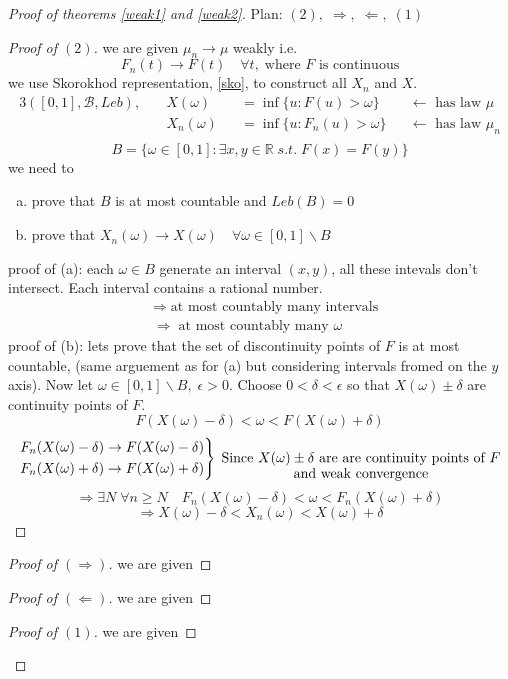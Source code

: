 \documentclass[12pt]{article}
\def\RR{\mathbb{R}}
\begin{document}
\begin{proof}[Proof of theorems \ref{weak1} and \ref{weak2}]
Plan: $(2), \; \Rightarrow, \; \Leftarrow,\; (1)$
\begin{proof}[Proof of $(2)$]
we are given $\mu_n \rightarrow \mu$ weakly i.e.
\[F_n(t) \rightarrow F(t) \quad \forall t, \; \text{where $F$ is continuous}\]
we use Skorokhod representation, \ref{sko}, to construct all $X_n$ and $X$.
 \begin{alignat*}{3}
([0,1],\mathcal{B}, Leb), \quad &X(\omega)& &= \inf\{u:F(u)>\omega\}& &\leftarrow \text{ has law }\mu \\
&X_n(\omega)& &=\inf\{u:F_n(u)>\omega\} &  &\leftarrow \text{ has law }\mu_n \\
\end{alignat*}
\[B= \{\omega \in [0,1] : \exists x,y \in \RR\; s.t. \; F(x)=F(y)\}\]
we need to
\begin{enumerate}[(a)]
\item prove that $B$ is at most countable and $Leb(B) = 0$
\item prove that $X_n(\omega) \rightarrow X(\omega) \quad \forall \omega \in [0,1]\backslash B$
\end{enumerate}
proof of (a): each $\omega \in B$ generate an interval $(x,y)$, all these intevals don't intersect. Each interval contains a rational number. \begin{align*}
&\Rightarrow\; \text{at most countably many intervals}\\
&\Rightarrow\; \text{at most countably many }\omega
\end{align*}
proof of (b): lets prove that the set of discontinuity points of $F$ is at most countable, (same arguement as for (a) but considering intervals fromed on the $y$ axis). Now let $\omega \in [0,1]\backslash B, \; \epsilon >0$. Choose $0<\delta<\epsilon$ so that $X(\omega) \pm \delta$ are continuity points of $F$. 
\[F(X(\omega) - \delta) < \omega < F(X(\omega) + \delta) \]
\[\left.\begin{aligned}
       F_n(X(\omega) - \delta) &\rightarrow F(X(\omega) - \delta)\\
        F_n(X(\omega) + \delta) &\rightarrow F(X(\omega) + \delta)
       \end{aligned}
 \right\} \; \underset{\text{\normalsize and weak convergence}}{\text{Since  $X(\omega) \pm \delta$  are are continuity points of $F$}}\]
\[\Rightarrow \exists N\; \forall n\geq N \quad F_n(X(\omega) - \delta) < \omega < F_n(X(\omega) + \delta) \]
\[\Rightarrow X(\omega) - \delta < X_n(\omega) < X(\omega) + \delta\]



\end{proof}
\begin{proof}[Proof of $(\Rightarrow)$]
we are given 
\end{proof}
\begin{proof}[Proof of $(\Leftarrow)$]
we are given 
\end{proof}
\begin{proof}[Proof of $(1)$]
we are given 
\end{proof}
\end{proof}
\end{document}
